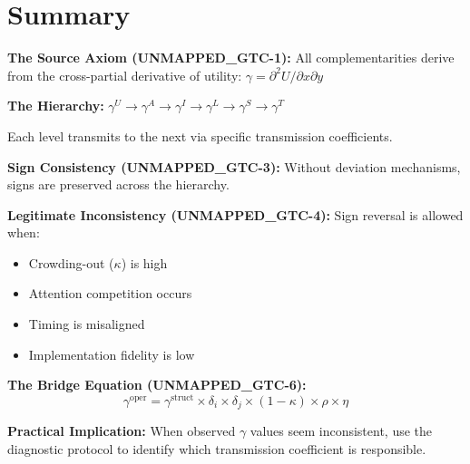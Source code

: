 \section{Summary}
\label{sec:gtc-summary}

\begin{tcolorbox}[colback=blue!5!white, colframe=blue!75!black,
    title=Key Results: General Theory of Complementarity]

\textbf{The Source Axiom (UNMAPPED_GTC-1):}
All complementarities derive from the cross-partial derivative of utility:
$\gamma = \partial^2 U / \partial x \partial y$

\textbf{The Hierarchy:}
$\gamma^U \to \gamma^A \to \gamma^I \to \gamma^L \to \gamma^S \to \gamma^T$

Each level transmits to the next via specific transmission coefficients.

\textbf{Sign Consistency (UNMAPPED_GTC-3):}
Without deviation mechanisms, signs are preserved across the hierarchy.

\textbf{Legitimate Inconsistency (UNMAPPED_GTC-4):}
Sign reversal is allowed when:
\begin{itemize}[nosep]
    \item Crowding-out ($\kappa$) is high
    \item Attention competition occurs
    \item Timing is misaligned
    \item Implementation fidelity is low
\end{itemize}

\textbf{The Bridge Equation (UNMAPPED_GTC-6):}
\begin{equation}
\gamma^{\text{oper}} = \gamma^{\text{struct}} \times \delta_i \times \delta_j \times (1-\kappa) \times \rho \times \eta
\end{equation}

\textbf{Practical Implication:}
When observed $\gamma$ values seem inconsistent, use the diagnostic protocol
to identify which transmission coefficient is responsible.

\end{tcolorbox}


